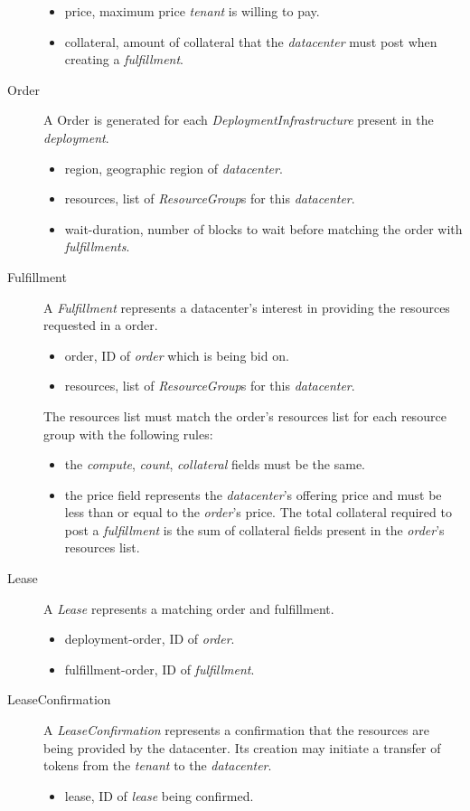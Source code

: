 \documentclass[11pt,english]{article}
\theoremstyle{definition}
\begin{document}
\begin{description}
\begin{itemize}
		\item price, maximum price \textit{tenant} is willing to pay.
		\item collateral, amount of collateral that the \textit{datacenter} must post when creating a \textit{fulfillment}.
	\end{itemize}
	\item [Order] A Order is generated for each \textit{DeploymentInfrastructure} present in the \textit{deployment}.
	\begin{itemize}
		\item region, geographic region of \textit{datacenter}.
		\item resources,	 list of \textit{ResourceGroup}s for this \textit{datacenter}.
		\item wait-duration, number of blocks to wait before matching the order with \textit{fulfillments}.
	\end{itemize}
	\item [Fulfillment] A \textit{Fulfillment} represents a datacenter's interest in providing the resources requested in a order.
	\begin{itemize}
		\item order, ID of \textit{order} which is being bid on.
		\item resources, list of \textit{ResourceGroup}s for this \textit{datacenter}.
	\end{itemize}
	The resources list must match the order's resources list for each resource group with the following rules:
	\begin{itemize}
		\item the \textit{compute}, \textit{count}, \textit{collateral} fields must be the same.
		\item the price field represents the \textit{datacenter}'s offering price and must be less than or equal to the \textit{order}'s price.
		The total collateral required to post a \textit{fulfillment} is the sum of collateral fields present in the \textit{order}'s resources list.
	\end{itemize}
	\item [Lease] A \textit{Lease} represents a matching order and fulfillment.
	\begin{itemize}
		\item deployment-order, ID of \textit{order}.
		\item fulfillment-order,	 ID of \textit{fulfillment}.
	\end{itemize}
	\item [LeaseConfirmation] A \textit{LeaseConfirmation} represents a confirmation that the resources are being provided by the datacenter. Its creation may initiate a transfer of tokens from the \textit{tenant} to the \textit{datacenter}.
	\begin{itemize}
		\item lease, ID of \textit{lease} being confirmed.
	\end{itemize}
\end{description}
\end{document}
